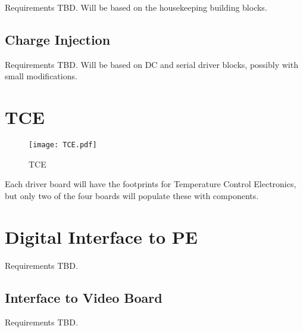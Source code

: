 \documentclass[a4paper,12pt]{article}
\begin{document}
Requirements TBD. Will be based on the housekeeping building blocks.

\subsection{Charge Injection}

Requirements TBD. Will be based on DC and serial driver blocks, possibly with small modifications.

\section{TCE}

   \begin{figure}
   \begin{center}
   \texttt{[image: TCE.pdf]}
   \end{center}
   \caption{TCE}
   \end{figure}


Each driver board will have the footprints for Temperature Control Electronics, but only two of the four boards will populate these with components.

\section{Digital Interface to PE}

Requirements TBD.

\subsection{Interface to Video Board}

Requirements TBD.
  
\end{document}
